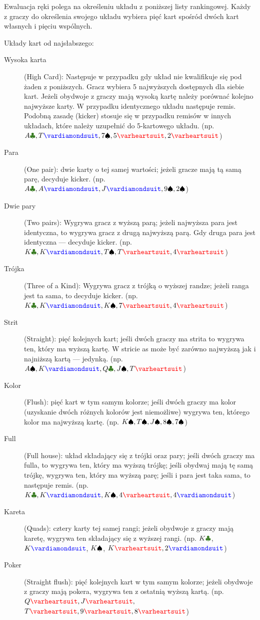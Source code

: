 Ewaluacja ręki polega na określeniu układu z poniższej listy rankingowej. Każdy z graczy do określenia swojego układu wybiera pięć kart spośród dwóch kart własnych i pięciu wspólnych.

Układy kart od najsłabszego:
\begin{description}
  \item[Wysoka karta] (High Card): Następuje w przypadku gdy układ nie kwalifikuje się pod żaden z poniższych. Gracz wybiera 5 najwyższych dostępnych dla siebie kart. Jeżeli obydwoje z graczy mają wysoką kartę należy porównać kolejno najwyższe karty. W przypadku identycznego układu następuje remis. Podobną zasadę (kicker) stosuje się w przypadku remisów w innych układach, które należy uzupełnić do 5-kartowego układu. (np. $A\clubs, T\diamonds, 7\spades, 5\hearts, 2\hearts$)
  \item[Para] (One pair): dwie karty o tej samej wartości; jeżeli gracze mają tą samą parę, decyduje kicker. (np. $A\clubs, A\diamonds, J\diamonds, 9\spades, 2\spades$)
  \item[Dwie pary] (Two pairs): Wygrywa gracz z wyższą parą; jeżeli najwyższa para jest identyczna, to wygrywa gracz z drugą najwyższą parą. Gdy druga para jest identyczna --- decyduje kicker. (np. $K\clubs, K\diamonds, T\spades, T\hearts, 4\hearts$)
  \item[Trójka] (Three of a Kind): Wygrywa gracz z trójką o wyższej randze; jeżeli ranga jest ta sama, to decyduje kicker. (np. $K\clubs, K\diamonds, K\spades, 7\hearts, 4\hearts$)
  \item[Strit] (Straight): pięć kolejnych kart; jeśli dwóch graczy ma strita to wygrywa ten, który ma wyższą kartę. W stricie as może być zarówno najwyższą jak i najniższą kartą --- jedynką. (np. $A\spades, K\diamonds, Q\clubs, J\spades, T\hearts$)
   \item[Kolor] (Flush): pięć kart w tym samym kolorze; jeśli dwóch graczy ma kolor (uzyskanie dwóch różnych kolorów jest niemożliwe) wygrywa ten, którego kolor ma najwyższą kartę. (np. $K\spadesuit, T\spadesuit, J\spadesuit, 8\spadesuit, 7\spadesuit$)
   \item[Full] (Full house): układ składający się z trójki oraz pary; jeśli dwóch graczy ma fulla, to wygrywa ten, który ma wyższą trójkę; jeśli obydwaj mają tę samą trójkę, wygrywa ten, który ma wyższą parę; jeśli i para jest taka sama, to następuje remis. (np. $K\clubs, K\diamonds, K\spades, 4\hearts, 4\diamonds$)
  \item[Kareta] (Quads): cztery karty tej samej rangi; jeżeli obydwoje z graczy mają karetę, wygrywa ten składający się z wyższej rangi. (np. $K\clubs$, $K\diamonds$, $K\spadesuit$, $K\hearts, 2\diamonds$)
  \item[Poker] (Straight flush): pięć kolejnych kart w tym samym kolorze; jeżeli obydwoje z graczy mają pokera, wygrywa ten z ostatnią wyższą kartą. (np. $Q\hearts, J\hearts,$ $T\hearts, 9\hearts, 8\hearts$)
\end{description}
 
